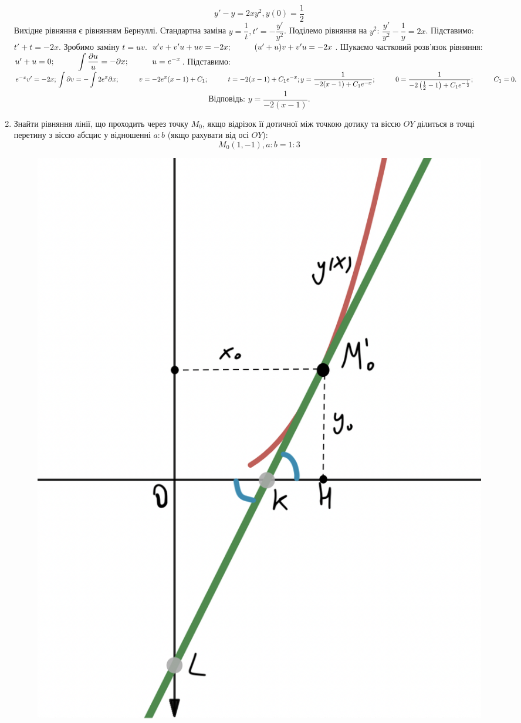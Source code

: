 \documentclass[a4paper,12pt]{article}
\newcommand\tab[1][1cm]{\hspace*{#1}}
\newcommand\dint{\displaystyle\int}
\begin{document}
\begin{justify}
\begin{enumerate}
 		$$y'-y=2xy^2,y(0)=\dfrac12$$
 		Вихідне рівняння є рівнянням Бернуллі. Стандартна заміна $y=\dfrac1t, t'=-\dfrac{y'}{y^2}$. Поділемо рівняння на $y^2$: $\dfrac{y'}{y^2}-\dfrac1y=2x$. Підставимо: $t'+t=-2x$. Зробимо заміну $t=uv$. $u'v+v'u+uv=-2x;\tab (u'+u)v+v'u=-2x$. Шукаємо частковий розв’язок рівняння: $u'+u=0;\tab \dint\dfrac{\partial u}u=-\displaystyle\partial x;\tab u=e^{-x}$. Підставимо: $e^{-x}v'=-2x;\\\dint\partial v=-\dint2e^x\partial x;\tab v=-2e^x(x-1)+C_1;\tab t=-2(x-1)+C_1e^{-x};\\y=\dfrac1{-2(x-1)+C_1e^{-x}};\tab 0=\dfrac1{-2\left(\frac12-1\right)+C_1e^{-\frac12}};\tab C_1=0.$ 
 		$$\textbf{Відповідь: } y=\dfrac1{-2(x-1)}.$$
	\item Знайти рівняння лінії, що проходить через точку $M_0$, якщо відрізок її дотичної між точкою дотику та віссю $OY$ ділиться в точці перетину з віссю абсцис у відношенні $a:b$ (якщо рахувати від осі $OY$):
		$$M_0(1, -1),a:b=1:3$$
		\begin{figure}[!h]
			\begin{center}
				\includegraphics[scale=0.4]{plot_0.png}

\end{center}
\end{figure}
\end{enumerate}
\end{justify}
\end{document}
